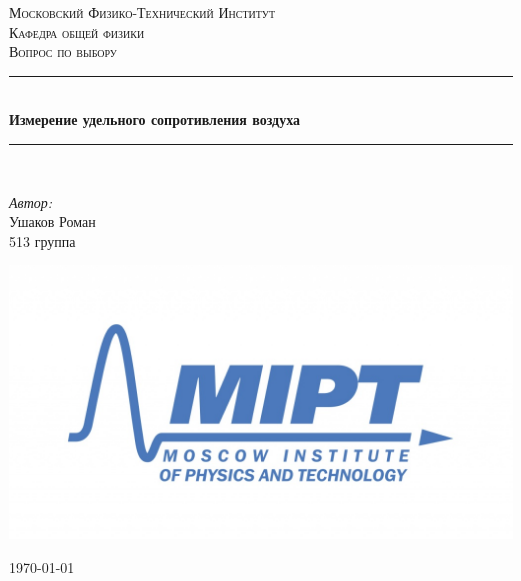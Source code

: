 \documentclass[a4paper, 12pt]{article}
\newenvironment{bottompar}{\par\vspace*{\fill}}{\clearpage}
\begin{document}
\begin{titlepage}

\newcommand{\HRule}{\rule{\linewidth}{0.5mm}} %

\center %
 

\textsc{\LARGE Московский Физико-Технический Институт}\\[1,5cm] %
\textsc{\Large Кафедра общей физики}\\[0.5cm] %
\textsc{\large Вопрос по выбору}\\[0.5cm] %


\HRule
\\[0.4cm]
{ \huge \bfseries  Измерение удельного сопротивления воздуха}
\\[0.2cm] %
\HRule
\\[1.5cm]


 


\begin{flushleft} \large
	\emph{Автор:}\\
	Ушаков Роман \\
	513 группа
\end{flushleft}


\begin{bottompar}
	\begin{center}
		\includegraphics[width = 80 mm]{logo.jpg}
	\end{center}
	{\large \today}

\end{bottompar}
\vfill %

\end{titlepage}
\end{document}
